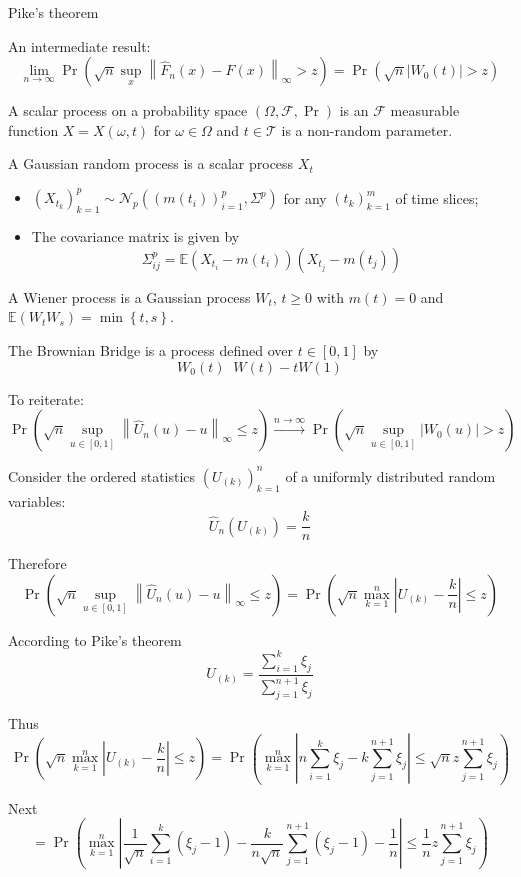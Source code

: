 \documentclass[a4paper]{article}
\newcommand{\obj}[1]{{\left\{ #1 \right \}}}
\newcommand{\clo}[1]{{\left [ #1 \right ]}}
\newcommand{\brac}[1]{{\left ( #1 \right )}}
\newcommand{\abs}[1]{{\left | #1 \right |}}
\newcommand{\nrm}[1]{{\left\| #1 \right \|}}
\newcommand{\Fcal}{\mathcal{F}}
\newcommand{\Tcal}{\mathcal{T}}
\newcommand{\Ncal}{\mathcal{N}}
\newcommand{\Ex}{\mathbb{E}}
\newcommand{\defn}{\mathop{\overset{\Delta}{=}}\nolimits}
\begin{document}
Pike's theorem


An intermediate result:
\[\lim_{n\to \infty} \Pr\brac{\sqrt{n} \sup_{x}\nrm{\hat{F}_n(x) - F(x)}_\infty > z} = \Pr\brac{\sqrt{n} \abs{W_0(t)} > z}\]

A scalar process on a probability space $\brac{\Omega, \Fcal, \Pr}$ is an $\Fcal$ measurable function $X = X(\omega, t)$ for $\omega\in \Omega$ and $t\in \Tcal$ is a non-random parameter.

A Gaussian random process is a scalar process $X_t$ \begin{itemize}
	\item $\brac{X_{t_k}}_{k=1}^p\sim \Ncal_p\brac{\brac{m(t_i)}_{i=1}^p, \Sigma^p}$ for any $\brac{t_k}_{k=1}^m$ of time slices;
	\item The covariance matrix is given by 
	\[\Sigma^p_{ij} = \Ex\brac{X_{t_i} - m(t_i)}\brac{X_{t_j} - m(t_j)}\]
\end{itemize}

A Wiener process is a Gaussian process $W_t$, $t\geq 0$ with $m(t) = 0$ and $\Ex\brac{W_t W_s} = \min\obj{t,s}$.

The Brownian Bridge is a process defined over $t\in\clo{0,1}$ by
\[W_0(t) \defn W(t) - t W(1)\]

To reiterate:
\[\Pr\brac{\sqrt{n} \sup_{u\in\clo{0,1}} \nrm{\hat{U}_n(u) - u}_\infty \leq z} \overset{n\to\infty}{\to} \Pr\brac{\sqrt{n} \sup_{u\in \clo{0,1}}\abs{W_0(u)} > z}\]

Consider the ordered statistics $\brac{U_{(k)}}_{k=1}^n$ of a uniformly distributed random variables:
\[\hat{U}_n(U_{(k)}) = \frac{k}{n}\]

Therefore 
\[\Pr\brac{\sqrt{n} \sup_{u\in\clo{0,1}} \nrm{\hat{U}_n(u) - u}_\infty \leq z}  = \Pr\brac{\sqrt{n} \max_{k=1}^n \abs{U_{(k)} - \frac{k}{n}} \leq z} \]

According to Pike's theorem
\[U_{(k)} = \frac{\sum_{i=1}^k \xi_j}{\sum_{j=1}^{n+1} \xi_j}\]

Thus 
\[\Pr\brac{\sqrt{n} \max_{k=1}^n \abs{U_{(k)} - \frac{k}{n}} \leq z}  = \Pr\brac{\max_{k=1}^n \abs{ n \sum_{i=1}^k \xi_j - k\sum_{j=1}^{n+1} \xi_j} \leq \sqrt{n} z\sum_{j=1}^{n+1} \xi_j } \]

Next
\[ = \Pr\brac{\max_{k=1}^n \abs{ \frac{1}{\sqrt{n}} \sum_{i=1}^k (\xi_j-1) - \frac{k}{n\sqrt{n}} \sum_{j=1}^{n+1} (\xi_j-1) - \frac{1}{n}} \leq \frac{1}{n} z\sum_{j=1}^{n+1} \xi_j } \]
\end{document}
